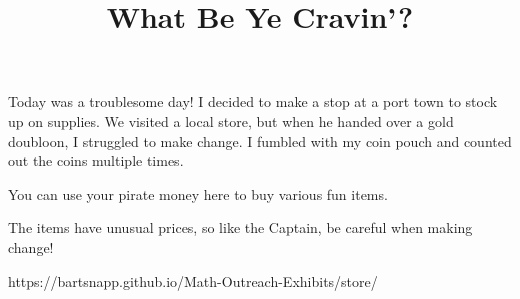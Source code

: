 \documentclass{../exhibit}
\title{What Be Ye Cravin'?}
\begin{document}
\begin{context}
  Today was a troublesome day! I decided to make a stop at a port town to stock up on supplies. We visited a local store, but when he handed over a gold doubloon, I struggled to make change.  I fumbled with my coin pouch and counted out the coins multiple times.
\end{context}

\begin{directions}
  You can use your pirate money here to buy various fun items.

  The items have unusual prices, so like the Captain, be careful when
making change!
\end{directions}


\begin{example}
\end{example}


\begin{mathConnections}
  https://bartsnapp.github.io/Math-Outreach-Exhibits/store/
\end{mathConnections}
\end{document}
